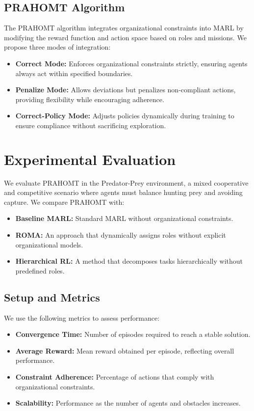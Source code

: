 \documentclass{article}
\begin{document}
\subsection{PRAHOMT Algorithm}
The PRAHOMT algorithm integrates organizational constraints into MARL by modifying the reward function and action space based on roles and missions. We propose three modes of integration:
\begin{itemize}
    \item \textbf{Correct Mode:} Enforces organizational constraints strictly, ensuring agents always act within specified boundaries.
    \item \textbf{Penalize Mode:} Allows deviations but penalizes non-compliant actions, providing flexibility while encouraging adherence.
    \item \textbf{Correct-Policy Mode:} Adjusts policies dynamically during training to ensure compliance without sacrificing exploration.
\end{itemize}

\section{Experimental Evaluation}
\label{sec:experiments}
We evaluate PRAHOMT in the Predator-Prey environment, a mixed cooperative and competitive scenario where agents must balance hunting prey and avoiding capture. We compare PRAHOMT with:
\begin{itemize}
    \item \textbf{Baseline MARL:} Standard MARL without organizational constraints.
    \item \textbf{ROMA:} An approach that dynamically assigns roles without explicit organizational models.
    \item \textbf{Hierarchical RL:} A method that decomposes tasks hierarchically without predefined roles.
\end{itemize}

\subsection{Setup and Metrics}
We use the following metrics to assess performance:
\begin{itemize}
    \item \textbf{Convergence Time:} Number of episodes required to reach a stable solution.
    \item \textbf{Average Reward:} Mean reward obtained per episode, reflecting overall performance.
    \item \textbf{Constraint Adherence:} Percentage of actions that comply with organizational constraints.
    \item \textbf{Scalability:} Performance as the number of agents and obstacles increases.
\end{itemize}
\end{document}
